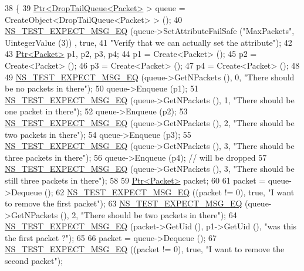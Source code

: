 \begin{DoxyCode}
38 \{
39   \hyperlink{classns3_1_1Ptr}{Ptr<DropTailQueue<Packet>} > queue = CreateObject<DropTailQueue<Packet> > ();
40   \hyperlink{group__testing_ga7304ba46a28d8cf08dfdfd6499cf7068}{NS\_TEST\_EXPECT\_MSG\_EQ} (queue->SetAttributeFailSafe (\textcolor{stringliteral}{"MaxPackets"}, UintegerValue (3))
      , \textcolor{keyword}{true},
41                          \textcolor{stringliteral}{"Verify that we can actually set the attribute"});
42 
43   \hyperlink{classns3_1_1Ptr}{Ptr<Packet>} p1, p2, p3, p4;
44   p1 = Create<Packet> ();
45   p2 = Create<Packet> ();
46   p3 = Create<Packet> ();
47   p4 = Create<Packet> ();
48 
49   \hyperlink{group__testing_ga7304ba46a28d8cf08dfdfd6499cf7068}{NS\_TEST\_EXPECT\_MSG\_EQ} (queue->GetNPackets (), 0, \textcolor{stringliteral}{"There should be no packets in
       there"});
50   queue->Enqueue (p1);
51   \hyperlink{group__testing_ga7304ba46a28d8cf08dfdfd6499cf7068}{NS\_TEST\_EXPECT\_MSG\_EQ} (queue->GetNPackets (), 1, \textcolor{stringliteral}{"There should be one packet in
       there"});
52   queue->Enqueue (p2);
53   \hyperlink{group__testing_ga7304ba46a28d8cf08dfdfd6499cf7068}{NS\_TEST\_EXPECT\_MSG\_EQ} (queue->GetNPackets (), 2, \textcolor{stringliteral}{"There should be two packets in
       there"});
54   queue->Enqueue (p3);
55   \hyperlink{group__testing_ga7304ba46a28d8cf08dfdfd6499cf7068}{NS\_TEST\_EXPECT\_MSG\_EQ} (queue->GetNPackets (), 3, \textcolor{stringliteral}{"There should be three packets in
       there"});
56   queue->Enqueue (p4); \textcolor{comment}{// will be dropped}
57   \hyperlink{group__testing_ga7304ba46a28d8cf08dfdfd6499cf7068}{NS\_TEST\_EXPECT\_MSG\_EQ} (queue->GetNPackets (), 3, \textcolor{stringliteral}{"There should be still three
       packets in there"});
58 
59   \hyperlink{classns3_1_1Ptr}{Ptr<Packet>} packet;
60 
61   packet = queue->Dequeue ();
62   \hyperlink{group__testing_ga7304ba46a28d8cf08dfdfd6499cf7068}{NS\_TEST\_EXPECT\_MSG\_EQ} ((packet != 0), \textcolor{keyword}{true}, \textcolor{stringliteral}{"I want to remove the first packet"});
63   \hyperlink{group__testing_ga7304ba46a28d8cf08dfdfd6499cf7068}{NS\_TEST\_EXPECT\_MSG\_EQ} (queue->GetNPackets (), 2, \textcolor{stringliteral}{"There should be two packets in
       there"});
64   \hyperlink{group__testing_ga7304ba46a28d8cf08dfdfd6499cf7068}{NS\_TEST\_EXPECT\_MSG\_EQ} (packet->GetUid (), p1->GetUid (), \textcolor{stringliteral}{"was this the first packet
       ?"});
65 
66   packet = queue->Dequeue ();
67   \hyperlink{group__testing_ga7304ba46a28d8cf08dfdfd6499cf7068}{NS\_TEST\_EXPECT\_MSG\_EQ} ((packet != 0), \textcolor{keyword}{true}, \textcolor{stringliteral}{"I want to remove the second packet"});

\end{DoxyCode}
